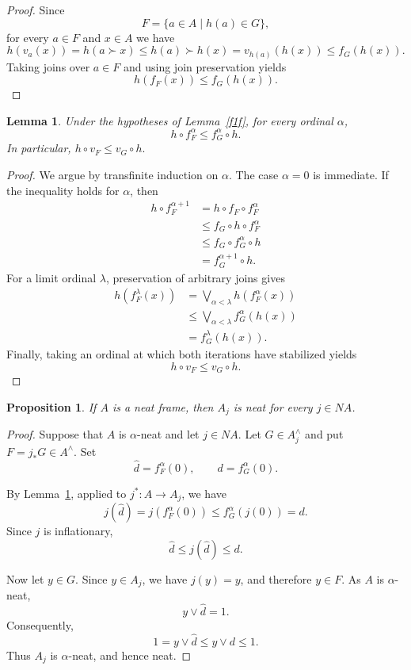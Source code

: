 \documentclass[11pt]{amsart}
\theoremstyle{plain}
\newtheorem{lem}[thm]{Lemma}
\newtheorem{prop}[thm]{Proposition}
\theoremstyle{definition}
\begin{document}
\begin{proof}
Since
\[
F=\{a\in A\mid h(a)\in G\},
\]
for every $a\in F$ and $x\in A$ we have
\[
h(v_a(x))
=h(a\succ x)
\leq h(a)\succ h(x)
=v_{h(a)}(h(x))
\leq f_G(h(x)).
\]
Taking joins over $a\in F$ and using
join preservation yields
\[
h(f_F(x))\leq f_G(h(x)).
\]
\end{proof}

\begin{lem}\label{finftyf}
Under the hypotheses of Lemma~\ref{f1f},
for every ordinal $\alpha$,
\[
h\circ f_F^\alpha
\leq f_G^\alpha\circ h.
\]
In particular,
\(
h\circ v_F\leq v_G\circ h.
\)
\end{lem}

\begin{proof}
We argue by transfinite induction on $\alpha$.
The case $\alpha=0$ is immediate. If the
inequality holds for $\alpha$, then
\[
\begin{aligned}
h\circ f_F^{\alpha+1}
&=h\circ f_F\circ f_F^\alpha\\
&\leq f_G\circ h\circ f_F^\alpha\\
&\leq f_G\circ f_G^\alpha\circ h\\
&=f_G^{\alpha+1}\circ h.
\end{aligned}
\]
For a limit ordinal $\lambda$, preservation
of arbitrary joins gives
\[
\begin{aligned}
h(f_F^\lambda(x))
&=\bigvee_{\alpha<\lambda}
h(f_F^\alpha(x))\\
&\leq\bigvee_{\alpha<\lambda}
f_G^\alpha(h(x))\\
&=f_G^\lambda(h(x)).
\end{aligned}
\]
Finally, taking an ordinal at which both
iterations have stabilized yields
\[
h\circ v_F\leq v_G\circ h.
\]
\end{proof}

\begin{prop}\label{tidyquout}
If $A$ is a neat frame, then $A_j$
is neat for every $j\in NA$.
\end{prop}

\begin{proof}
Suppose that $A$ is $\alpha$-neat and let $j\in NA$.
Let $G\in A_j^\wedge$ and put
$F=j_*G\in A^\wedge$. Set
\[
\widehat d=f_F^\alpha(0),
\qquad
d=f_G^\alpha(0).
\]

By Lemma~\ref{finftyf}, applied to
$j^*:A\to A_j$, we have
\[
j(\widehat d)
=j(f_F^\alpha(0))
\leq f_G^\alpha(j(0))
=d.
\]
Since $j$ is inflationary,
\[
\widehat d\leq j(\widehat d)\leq d.
\]

Now let $y\in G$. Since $y\in A_j$,
we have $j(y)=y$, and therefore
$y\in F$. As $A$ is $\alpha$-neat,
\[
y\vee\widehat d=1.
\]
Consequently,
\[
1=y\vee\widehat d
\leq y\vee d\leq1.
\]
Thus $A_j$ is $\alpha$-neat, and hence neat.
\end{proof}
\end{document}
